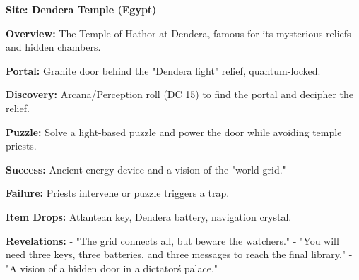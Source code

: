 \documentclass[12pt]{article}
\begin{document}
\textbf{Site: Dendera Temple (Egypt)}

\textbf{Overview:}  
The Temple of Hathor at Dendera, famous for its mysterious reliefs and hidden chambers.

\textbf{Portal:}  
Granite door behind the "Dendera light" relief, quantum-locked.

\textbf{Discovery:}  
Arcana/Perception roll (DC 15) to find the portal and decipher the relief.

\textbf{Puzzle:}  
Solve a light-based puzzle and power the door while avoiding temple priests.

\textbf{Success:}  
Ancient energy device and a vision of the "world grid."

\textbf{Failure:}  
Priests intervene or puzzle triggers a trap.

\textbf{Item Drops:}  
Atlantean key, Dendera battery, navigation crystal.

\textbf{Revelations:}
- "The grid connects all, but beware the watchers."
- "You will need three keys, three batteries, and three messages to reach the final library."
- "A vision of a hidden door in a dictator\'s palace."
\end{document}
